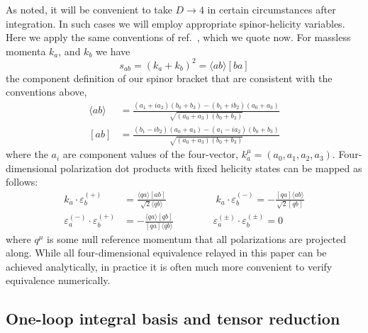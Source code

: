 \documentclass[11pt,letter]{article}
\begin{document}
As noted, it will be convenient to take $D\rightarrow 4$ in certain circumstances after integration.  In such cases we will employ appropriate spinor-helicity variables.  Here we apply the same conventions of ref.~\cite{jjmcTASI2014}, which we quote now. For massless momenta $k_a$, and $k_b$ we have 
\begin{equation}
s_{ab} = (k_a+k_b)^2= \langle ab \rangle[ba]
\end{equation}
the component definition of our spinor bracket that are consistent with the conventions above,
\begin{align}
\langle ab \rangle &= \frac{(a_1 + i a_2)(b_0+b_3)-(b_1 + i b_2)(a_0+a_3)}{\sqrt{(a_0+a_3)(b_0+b_3)}}
\\
[ab] &= \frac{(b_1 - i b_2)(a_0+a_3)-(a_1 - i a_2)(b_0+b_3)}{\sqrt{(a_0+a_3)(b_0+b_3)}}
\end{align}
where the $a_i$ are component values of the four-vector, $k^\mu_a = (a_0,a_1,a_2,a_3)$. Four-dimensional polarization dot products with fixed helicity states can be mapped as follows:
\begin{equation}\label{eqn:4DPols}
\begin{aligned}
k_a \cdot \varepsilon_b^{(+)} &= \frac{\langle q a \rangle[ab]}{\sqrt{2}\langle q b\rangle}
\qquad\quad \qquad
k_a \cdot \varepsilon_b^{(-)} = -\frac{[qa]\langle ab\rangle}{\sqrt{2}[qb]}
\\
\varepsilon_a^{(-)}\cdot \varepsilon_b^{(+)} &= - \frac{\langle q a\rangle [qb]}{ [qa]\langle q b\rangle} 
\qquad \qquad
\varepsilon_a^{(\pm)}\cdot \varepsilon_b^{(\pm)} = 0 
\end{aligned}
\end{equation}
where $q^\mu$ is some null reference momentum that all polarizations are projected along. While all four-dimensional equivalence relayed in this paper can be achieved analytically, in practice it is often much more  convenient to verify equivalence numerically.
 
\iffalse
 With this in hand, we will transition away from on-shell methods and venture into the Lagrangian descriptions of the theories that we will study throughout the text. %
 \fi 


\subsection{One-loop integral basis and tensor reduction}
\label{sec:1loopMethods}
\end{document}
